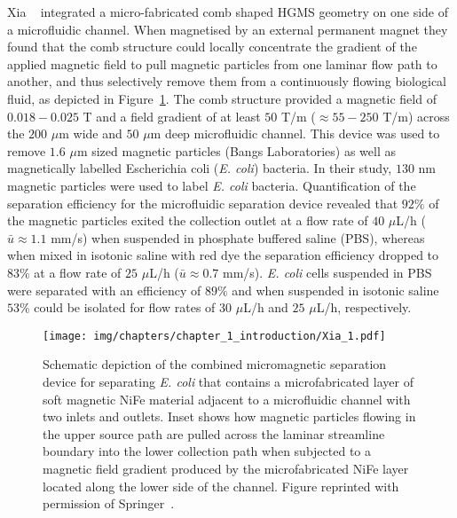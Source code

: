 Xia \etal{}~\cite{Xia2006} integrated a micro-fabricated comb shaped HGMS geometry on one side of a microfluidic channel. When magnetised by an external permanent magnet they found that the comb structure could locally concentrate the gradient of the applied magnetic field to pull magnetic particles from one laminar flow path to another, and thus selectively remove them from a continuously flowing biological fluid, as depicted in Figure~\ref{fig:Xia2006}. The comb structure provided a magnetic field of $0.018-0.025$ T and a field gradient of at least $50$ T/m ($\approx 55-250$ T/m) across the $200$ $\mu$m wide and $50$ $\mu$m deep microfluidic channel. This device was used to remove $1.6$ $\mu$m sized magnetic particles (Bangs Laboratories) as well as magnetically labelled Escherichia coli (\textit{E. coli}) bacteria. In their study, $130$ nm magnetic particles were used to label \textit{E. coli} bacteria. Quantification of the separation efficiency for the microfluidic separation device revealed that $92\%$ of the magnetic particles exited the collection outlet at a flow rate of $40$ $\mu$L/h ($\bar{u}\approx 1.1$ mm/s) when suspended in phosphate buffered saline (PBS), whereas when mixed in isotonic saline with red dye the separation efficiency dropped to $83\%$ at a flow rate of $25$ $\mu$L/h ($\bar{u}\approx 0.7$ mm/s). \textit{E. coli} cells suspended in PBS were separated with an efficiency of $89\%$ and when suspended in isotonic saline $53\%$ could be isolated for flow rates of $30$ $\mu$L/h and $25$ $\mu$L/h, respectively.

\begin{figure}[htb]
        \centering
        \texttt{[image: img/chapters/chapter\_1\_introduction/Xia\_1.pdf]}
        \caption[Micro-fabricated comb shaped HGMS microfluidic device]{Schematic depiction of the combined micromagnetic separation device for separating \textit{E. coli} that contains a microfabricated layer of soft magnetic NiFe material adjacent to a microfluidic channel with two inlets and outlets. Inset shows how magnetic particles flowing in the upper source path are pulled across the laminar streamline boundary into the lower collection path when subjected to a magnetic field gradient produced by the microfabricated NiFe layer located along the lower side of the channel. Figure reprinted with permission of Springer~\cite{Xia2006}.}
        \label{fig:Xia2006}
\end{figure}

